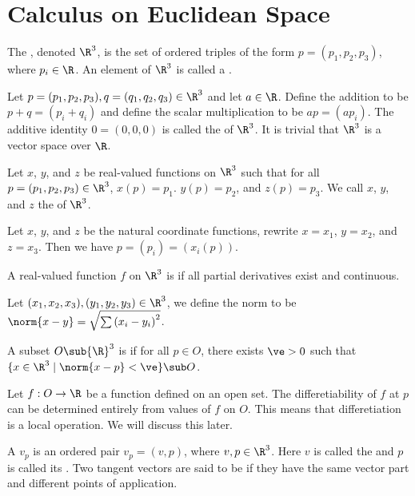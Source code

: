 \documentclass[12pt]{article}
\begin{document}
\hsetup
\htoc
\hmain
\par
\section{Calculus on Euclidean Space}
\begin{definition}
    The , denoted ${\R}^{3}$, is the set of ordered triples of the form $p=({p}_{1},{p}_{2},{p}_{3})$, where ${p}_{i}\in\R$. An element of ${\R}^{3}$ is called a .
\end{definition}
\par
Let $p=({p}_{1},{p}_{2},{p}_{3}),q=({q}_{1},{q}_{2},{q}_{3})\in{\R}^{3}$ and let $a\in\R$. Define the addition to be $p+q=({p}_{i}+{q}_{i})$ and define the scalar multiplication to be $ap=(a{p}_{i})$. The additive identity $0=(0,0,0)$ is called the  of ${\R}^{3}$. It is trivial that ${\R}^{3}$ is a vector space over $\R$.
\begin{definition}
    Let $x$, $y$, and $z$ be real-valued functions on ${\R}^{3}$ such that for all $p=({p}_{1},{p}_{2},{p}_{3})\in{\R}^{3}$, $x(p)={p}_{1}$. $y(p)={p}_{2}$, and $z(p)={p}_{3}$. We call $x$, $y$, and $z$ the  of ${\R}^{3}$.
\end{definition}
\par
Let $x$, $y$, and $z$ be the natural coordinate functions, rewrite $x={x}_{1}$, $y={x}_{2}$, and $z={x}_{3}$. Then we have $p=({p}_{i})=({x}_{i}(p))$.
\begin{definition}
    A real-valued function $f$ on ${\R}^{3}$ is  if all partial derivatives exist and continuous.
\end{definition}
\par
Let $({x}_{1},{x}_{2},{x}_{3}),({y}_{1},{y}_{2},{y}_{3})\in{\R}^{3}$, we define the norm to be $\norm{x-y}=\sqrt{\sum{({x}_{i}-{y}_{i})}^{2}}$.
\begin{definition}
    A subset $O\sub{\R}^{3}$ is  if for all $p\in O$, there exists $\ve>0$ such that $\{x\in{\R}^{3}\mid\norm{x-p}<\ve\}\sub O$. 
\end{definition}
\par
Let $f:O\to\R$ be a function defined on an open set. The differetiability of $f$ at $p$ can be determined entirely from values of $f$ on $O$. This means that differetiation is a local operation. We will discuss this later.
\begin{definition}
    A  ${v}_{p}$ is an ordered pair ${v}_{p}=(v,p)$, where $v,p\in{\R}^{3}$. Here $v$ is called the  and $p$ is called its . Two tangent vectors are said to be  if they have the same vector part and different points of application.
\end{definition}
\end{document}
